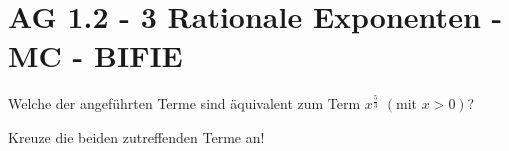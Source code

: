 \section{AG 1.2 - 3 Rationale Exponenten - MC - BIFIE}

\begin{beispiel}[AG 1.2]{1} %
		Welche der angeführten Terme sind äquivalent zum Term $x^{\frac{5}{3}}$ $\left( \text{mit } x>0 \right)$?
			
			Kreuze die beiden zutreffenden Terme an!
\end{beispiel}

